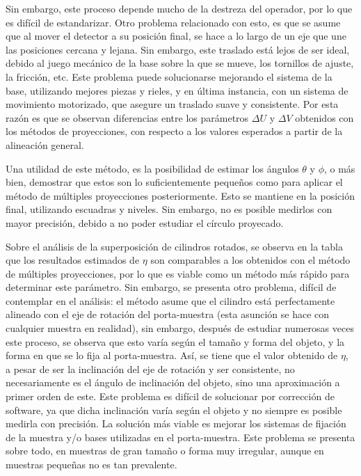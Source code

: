 Sin embargo, este proceso depende mucho de la destreza
del operador, por lo que es difícil de estandarizar. Otro problema relacionado con esto, es que
se asume que al mover el detector a su posición final, se hace a lo largo de un eje que une
las posiciones cercana y lejana. Sin embargo, este traslado está lejos de ser ideal, debido al
juego mecánico de la base sobre la que se mueve, los tornillos de ajuste, la fricción, etc. Este
problema puede solucionarse mejorando el sistema de la base, utilizando mejores piezas y rieles,
y en última instancia, con un sistema de movimiento motorizado, que asegure un traslado suave
y consistente. Por esta razón es que se observan diferencias entre los parámetros $\Delta U$ y $\Delta V$ obtenidos
con los métodos de proyecciones, con respecto a los valores esperados a partir de la alineación general.

Una utilidad de este método, es la posibilidad de estimar los ángulos $\theta$ y $\phi$, o más bien,
demostrar que estos son lo suficientemente pequeños como para aplicar el método de múltiples proyecciones
posteriormente. Esto se mantiene en la posición final, utilizando escuadras y niveles. Sin
embargo, no es posible medirlos con mayor precisión, debido a no poder estudiar el círculo
proyecado.

Sobre el análisis de la superposición de cilindros rotados, se observa en la tabla que los resultados
estimados de $\eta$ son comparables a los obtenidos con el método de múltiples proyecciones, por lo que es
viable como un método más rápido para determinar este parámetro. Sin embargo, se presenta otro
problema, difícil de contemplar en el análisis: el método asume que el cilindro está perfectamente
alineado con el eje de rotación del porta-muestra (esta asunción se hace con cualquier muestra en realidad),
sin embargo, después de estudiar numerosas veces este proceso, se observa que esto varía según el
tamaño y forma del objeto, y la forma en que se lo fija al porta-muestra. Así, se tiene que el
valor obtenido de $\eta$, a pesar de ser la inclinación del eje de rotación y ser consistente, no
necesariamente es el ángulo de inclinación del objeto, sino una aproximación a primer orden de este.
Este problema es difícil de solucionar por corrección de software, ya que dicha inclinación
varía según el objeto y no siempre es posible medirla con precisión. La solución más viable es
mejorar los sistemas de fijación de la muestra y/o bases utilizadas en el porta-muestra.
Este problema se presenta sobre todo, en muestras de gran tamaño o forma muy irregular, aunque en
muestras pequeñas no es tan prevalente.

